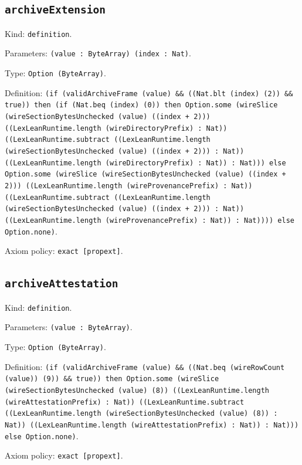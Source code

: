 \documentclass[11pt]{article}
\begin{document}
\subsection*{\texttt{archiveExtension}}
\noindent Kind: \texttt{definition}.\par
\noindent Parameters: \texttt{(value : ByteArray) (index : Nat)}.\par
\noindent Type: \texttt{Option (ByteArray)}.\par
\noindent Definition: \texttt{(if (validArchiveFrame (value) \&\& ((Nat.blt (index) (2)) \&\& true)) then (if (Nat.beq (index) (0)) then Option.some (wireSlice (wireSectionBytesUnchecked (value) ((index + 2))) ((LexLeanRuntime.length (wireDirectoryPrefix) : Nat)) ((LexLeanRuntime.subtract ((LexLeanRuntime.length (wireSectionBytesUnchecked (value) ((index + 2))) : Nat)) ((LexLeanRuntime.length (wireDirectoryPrefix) : Nat)) : Nat))) else Option.some (wireSlice (wireSectionBytesUnchecked (value) ((index + 2))) ((LexLeanRuntime.length (wireProvenancePrefix) : Nat)) ((LexLeanRuntime.subtract ((LexLeanRuntime.length (wireSectionBytesUnchecked (value) ((index + 2))) : Nat)) ((LexLeanRuntime.length (wireProvenancePrefix) : Nat)) : Nat)))) else Option.none)}.\par
\noindent Axiom policy: \texttt{exact [propext]}.\par
\subsection*{\texttt{archiveAttestation}}
\noindent Kind: \texttt{definition}.\par
\noindent Parameters: \texttt{(value : ByteArray)}.\par
\noindent Type: \texttt{Option (ByteArray)}.\par
\noindent Definition: \texttt{(if (validArchiveFrame (value) \&\& ((Nat.beq (wireRowCount (value)) (9)) \&\& true)) then Option.some (wireSlice (wireSectionBytesUnchecked (value) (8)) ((LexLeanRuntime.length (wireAttestationPrefix) : Nat)) ((LexLeanRuntime.subtract ((LexLeanRuntime.length (wireSectionBytesUnchecked (value) (8)) : Nat)) ((LexLeanRuntime.length (wireAttestationPrefix) : Nat)) : Nat))) else Option.none)}.\par
\noindent Axiom policy: \texttt{exact [propext]}.\par
\end{document}
